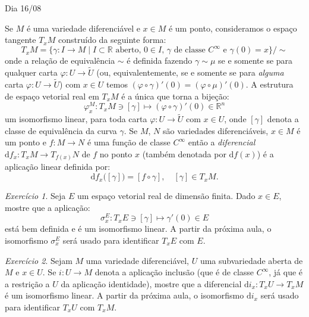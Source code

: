 \documentclass[oneside,11pt]{amsart}
\newcommand{\R}{\mathds R}
\newcommand{\dd}{\mathrm d}
\theoremstyle{remark}\newtheorem{exercise}{Exercício}[section]
\theoremstyle{plain}\newtheorem{teo}{Teorema}[section]
\theoremstyle{plain}\newtheorem{lem}[teo]{Lema}
\theoremstyle{plain}\newtheorem{prop}[teo]{Proposição}
\theoremstyle{definition}\newtheorem{defin}[teo]{Definição}
\theoremstyle{remark}\newtheorem{rem}[teo]{Observação}
\theoremstyle{definition}\newtheorem{example}[teo]{Exemplo}
\numberwithin{equation}{section}
\begin{document}
\begin{section}{Dia 16/08}

Se $M$ é uma variedade diferenciável e $x\in M$ é um ponto, consideramos o espaço tangente $T_xM$ construído da seguinte forma:
\[T_xM=\big\{\gamma:I\to M\mid\text{$I\subset\R$ aberto, $0\in I$, $\gamma$ de classe $C^\infty$ e $\gamma(0)=x$}\big\}/{\sim}\]
onde a relação de equivalência $\sim$ é definida fazendo $\gamma\sim\mu$ se e somente se para qualquer carta $\varphi:U\to\widetilde U$ (ou,
equivalentemente, se e somente se para {\em alguma\/} carta $\varphi:U\to\widetilde U$) com $x\in U$ temos $(\varphi\circ\gamma)'(0)=(\varphi\circ\mu)'(0)$.
A estrutura de espaço vetorial real em $T_xM$ é a única que torna a bijeção:
\begin{equation}\label{eq:varphiMx}
\varphi^M_x:T_xM\ni[\gamma]\longmapsto(\varphi\circ\gamma)'(0)\in\R^n
\end{equation}
um isomorfismo linear, para toda carta $\varphi:U\to\widetilde U$ com $x\in U$, onde $[\gamma]$ denota a classe de equivalência da curva $\gamma$.
Se $M$, $N$ são variedades diferenciáveis, $x\in M$ é um ponto e $f:M\to N$ é uma função de classe $C^\infty$ então a {\em diferencial\/}
$\dd f_x:T_xM\to T_{f(x)}N$ de $f$ no ponto $x$ (também denotada por $\dd f(x)$) é a aplicação linear definida por:
\begin{equation}\label{eq:defdf}
\dd f_x\big([\gamma]\big)=[f\circ\gamma],\quad[\gamma]\in T_xM.
\end{equation}

\begin{exercise}\label{exe:TxE}
Seja $E$ um espaço vetorial real de dimensão finita. Dado $x\in E$, mostre que a aplicação:
\[\sigma^E_x:T_xE\ni[\gamma]\longmapsto\gamma'(0)\in E\]
está bem definida e é um isomorfismo linear. A partir da próxima aula, o isomorfismo $\sigma^E_x$ será usado para identificar
$T_xE$ com $E$.
\end{exercise}

\begin{exercise}
Sejam $M$ uma variedade diferenciável, $U$ uma subvariedade aberta de $M$ e $x\in U$. Se $i:U\to M$ denota a aplicação inclusão (que é de classe $C^\infty$,
já que é a restrição a $U$ da aplicação identidade), mostre que a diferencial $\dd i_x:T_xU\to T_xM$ é um isomorfismo linear.
A partir da próxima aula, o isomorfismo $\dd i_x$ será usado para identificar $T_xU$ com $T_xM$.
\end{exercise}


\end{section}
\end{document}
